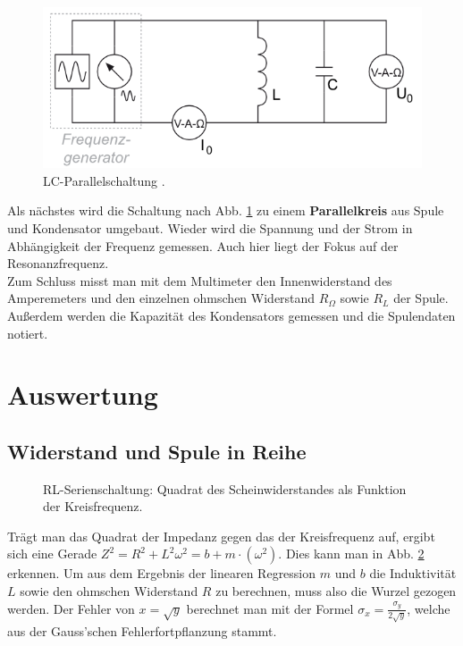 \documentclass[12pt,a4paper,titlepage,headinclude,bibtotoc]{scrartcl}
\begin{document}
\begin{figure}[!htb]
	\centering
	\includegraphics[scale=0.7]{parallel.png}
	\caption{LC-Parallelschaltung \cite[Datum: 03.10.14]{LP14}.}
	\label{fig:parallel}
\end{figure}


Als nächstes wird die Schaltung nach Abb. \ref{fig:parallel} zu einem \textbf{Parallelkreis} aus Spule und Kondensator umgebaut.
Wieder wird die Spannung und der Strom in Abhängigkeit der Frequenz gemessen.
Auch hier liegt der Fokus auf der Resonanzfrequenz.\\

Zum Schluss misst man mit dem Multimeter den Innenwiderstand des Amperemeters und den einzelnen ohmschen Widerstand $R_\Omega$ sowie $R_L$ der Spule.
Außerdem werden die Kapazität des Kondensators gemessen und die Spulendaten notiert. 

\section{Auswertung}
\label{sec:auswertung}
\subsection{Widerstand und Spule in Reihe}
\begin{figure}[!htb]
	\centering
	
	\caption{RL-Serienschaltung: Quadrat des Scheinwiderstandes als Funktion der Kreisfrequenz.}
	\label{fig:messung1}
\end{figure}
Trägt man das Quadrat der Impedanz gegen das der Kreisfrequenz auf, ergibt sich eine Gerade $Z^2=R^2+L^2\omega^2=b+m\cdot(\omega^2)$.
Dies kann man in Abb. \ref{fig:messung1} erkennen.
Um aus dem Ergebnis der linearen Regression $m$ und $b$ die Induktivität  $L$ sowie den ohmschen Widerstand $R$ zu berechnen, muss also die Wurzel gezogen werden.
Der Fehler von $x=\sqrt{y}$ berechnet man mit der Formel $\sigma_x=\frac{\sigma_y}{2\sqrt{y}}$, welche aus der Gauss'schen  Fehlerfortpflanzung stammt.
\end{document}

